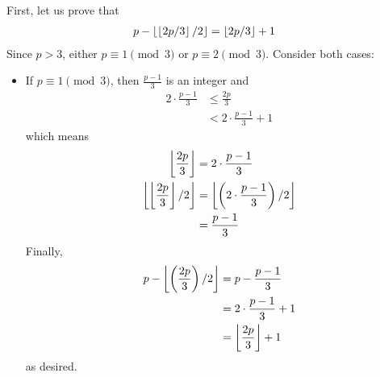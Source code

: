 	\begin{solution}
		First, let us prove that
			\begin{align}\label{eq:primefloor}
				p - \left\lfloor{\left\lfloor{2p/3}\right\rfloor/2}\right\rfloor
					& = \left\lfloor{2p/3}\right\rfloor+ 1
			\end{align}
		Since $p>3$, either $p \equiv 1 \pmod 3$ or $p \equiv 2 \pmod 3$. Consider both cases:
		\begin{itemize}
			\item If $p \equiv 1 \pmod 3$, then $\frac{p-1}{3}$ is an integer and
				\begin{align*}
					2\cdot\frac {p - 1}{3}
						& \leq\frac {2p}{3}\\
						& < 2\cdot\frac {p - 1}{3} + 1
				\end{align*}
			which means
				\begin{align*}
					\left\lfloor{\frac {2p}{3}}\right\rfloor
						&= 2\cdot\frac {p - 1}{3}\\
					\left\lfloor{\left\lfloor{\frac {2p}{3}}\right\rfloor/2}\right\rfloor
						&= \left\lfloor{\left(2\cdot\frac {p - 1}{3}\right)/2}\right\rfloor\\
						& = \frac {p - 1}{3}
				\end{align*}
			Finally,
				\begin{align*}
					p - \left\lfloor{\left(\frac {2p}{3}\right)/2}\right\rfloor
						& = p - \frac {p - 1}{3}\\
						& = 2\cdot\frac {p - 1}{3} + 1\\
						& = \left\lfloor{\frac {2p}{3}}\right\rfloor+ 1
				\end{align*}
			as desired.


\end{itemize}
\end{solution}
